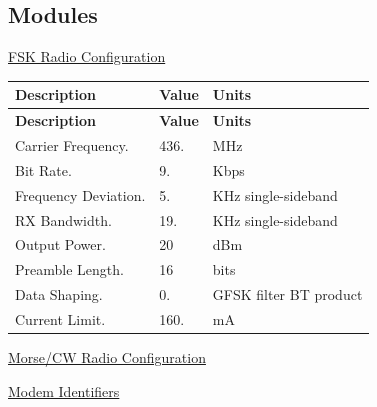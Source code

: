 \subsection*{Modules}
\begin{DoxyCompactItemize}
\item 
\hyperlink{group__defines__radio__non__ism__band__fsk__configuraiton}{F\+S\+K Radio Configuration}
\begin{DoxyCompactList}\small\item\em \tabulinesep=1mm
\begin{longtabu} spread 0pt [c]{*{3}{|X[-1]}|}
\hline
\rowcolor{\tableheadbgcolor}\textbf{ Description}&\textbf{ Value}&\textbf{ Units  }\\
\endfirsthead
\hline
\endfoot
\hline
\rowcolor{\tableheadbgcolor}\textbf{ Description}&\textbf{ Value}&\textbf{ Units  }\\
\endhead
Carrier Frequency.&436.&M\+Hz \\
Bit Rate.&9.&Kbps \\
Frequency Deviation.&5.&K\+Hz single-\/sideband \\
RX Bandwidth.&19.&K\+Hz single-\/sideband \\
Output Power.&20&d\+Bm \\
Preamble Length.&16&bits \\
Data Shaping.&0.&G\+F\+SK filter BT product \\
Current Limit.&160.&mA \\
\end{longtabu}
\end{DoxyCompactList}\item 
\hyperlink{group__defines__radio__morse__cw__configuration}{Morse/\+C\+W Radio Configuration}
\item 
\hyperlink{group__defines__radio__modem__configuration}{Modem Identifiers}
\end{DoxyCompactItemize}

